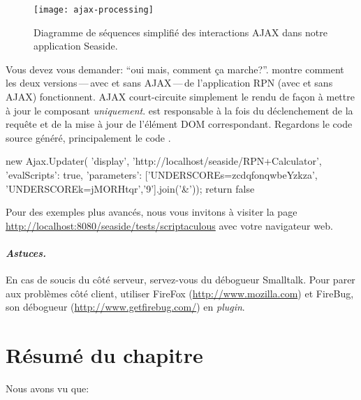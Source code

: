\documentclass[a4paper,10pt,twoside]{book}
\begin{document}
\begin{figure}[ht]
\begin{center}
\texttt{[image: ajax-processing]}
\caption{Diagramme de séquences simplifié des interactions AJAX dans notre application Seaside.}
\end{center}
\end{figure}


Vous devez vous demander: ``oui mais, comment ça marche?''.
 montre comment les deux versions\,---\,avec et
sans AJAX\,---\,de l'application RPN (avec et sans AJAX) fonctionnent.
AJAX court-circuite simplement le rendu de façon à mettre à jour le
composant  \emph{uniquement}. 
\jscript est responsable à la fois du déclenchement de la requête et
de la mise à jour de l'élément DOM correspondant.
Regardons le code source généré, principalement le code \jscript.

\begin{code}{}
new Ajax.Updater(
	'display',
	'http://localhost/seaside/RPN+Calculator',
	{'evalScripts': true,
	  'parameters': ['UNDERSCOREs=zcdqfonqwbeYzkza', 'UNDERSCOREk=jMORHtqr','9'].join('&')});
return false
\end{code}

Pour des exemples plus avancés, nous vous invitons à visiter la page
\url{http://localhost:8080/seaside/tests/scriptaculous} avec votre
navigateur web.

\paragraph{\emph{Astuces.}}
En cas de soucis du côté serveur, servez-vous du débogueur
Smalltalk. Pour parer aux problèmes côté client, utiliser FireFox
(\url{http://www.mozilla.com}) et FireBug, son débogueur \jscript
(\url{http://www.getfirebug.com/}) en \emph{plugin}.

\section{Résumé du chapitre}

Nous avons vu que:
\end{document}
